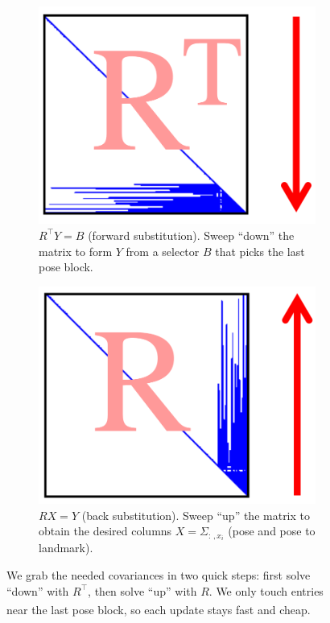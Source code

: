 \begin{figure}[H]
  \centering
  \begin{subfigure}[t]{0.49\linewidth}
    \centering
    \includegraphics[width=\linewidth]{Pictures/Optimizers/iSAM/Substitution_Forward.png}
    \caption{$R^\top Y = B$ (forward substitution). Sweep ``down'' the matrix to form $Y$ from a selector $B$ that picks the last pose block.}
    \label{fig:left}
  \end{subfigure}\hfill
  \begin{subfigure}[t]{0.49\linewidth}
    \centering
    \includegraphics[width=\linewidth]{Pictures/Optimizers/iSAM/Substitution_Downwards.png}
    \caption{$R X = Y$ (back substitution). Sweep ``up'' the matrix to obtain the desired columns $X=\Sigma_{:\,,x_i}$ (pose and pose to landmark).}
    \label{fig:right}
  \end{subfigure}
  \caption{We grab the needed covariances in two quick steps: first solve ``down'' with $R^\top$, then solve ``up'' with $R$. We only touch entries near the last pose block, so each update stays fast and cheap.\textsuperscript{\cite{iSAM_paper}}}
  \label{fig:substitution-foward-backwards}
\end{figure}
